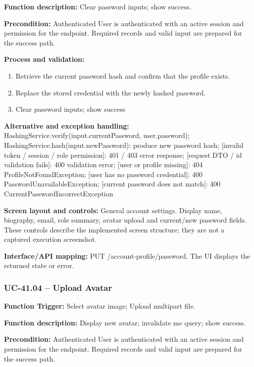 \textbf{Function description:} Clear password inputs; show success.

\textbf{Precondition:} Authenticated User is authenticated with an active session and permission for the endpoint. Required records and valid input are prepared for the success path.

\textbf{Process and validation:}
\begin{enumerate}
\item Retrieve the current password hash and confirm that the profile exists.
\item Replace the stored credential with the newly hashed password.
\item Clear password inputs; show success
\end{enumerate}
\textbf{Alternative and exception handling:} Hashing\allowbreak{}Service.verify(input.current\allowbreak{}Password, user.password); Hashing\allowbreak{}Service.hash(input.new\allowbreak{}Password): produce new password hash; [invalid token /\allowbreak{} session /\allowbreak{} role permission]: 401 /\allowbreak{} 403 error response; [request DTO /\allowbreak{} id validation fails]: 400 validation error; [user or profile missing]: 404 Profile\allowbreak{}Not\allowbreak{}Found\allowbreak{}Exception; [user has no password credential]: 400 Password\allowbreak{}Unavailable\allowbreak{}Exception; [current password does not match]: 400 Current\allowbreak{}Password\allowbreak{}Incorrect\allowbreak{}Exception

\textbf{Screen layout and controls:} General account settings. Display name, biography, email, role summary, avatar upload and current/\allowbreak{}new password fields. These controls describe the implemented screen structure; they are not a captured execution screenshot.

\textbf{Interface/\allowbreak{}API mapping:} PUT /\allowbreak{}account-profile/\allowbreak{}password. The UI displays the returned state or error.

\subsubsection{UC-41.04 -- Upload Avatar}
\textbf{Function Trigger:} Select avatar image; Upload multipart file.

\textbf{Function description:} Display new avatar; invalidate me query; show success.

\textbf{Precondition:} Authenticated User is authenticated with an active session and permission for the endpoint. Required records and valid input are prepared for the success path.

